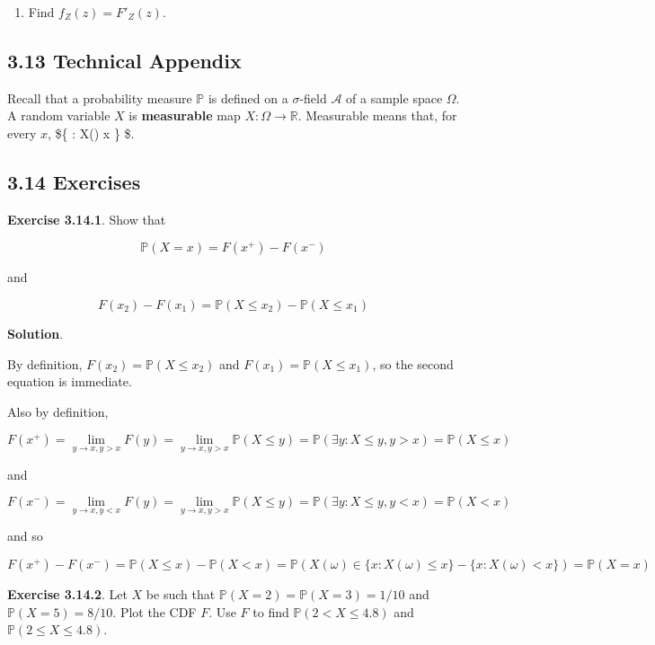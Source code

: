 \begin{enumerate}[tightlist,label={\arabic*.},resume]
\item
  Find \(f_Z(z) = F'_Z(z)\).
\end{enumerate}

\subsection{3.13 Technical Appendix}\label{technical-appendix}

Recall that a probability measure \(\mathbb{P}\) is defined on a
\(\sigma\)-field \(\mathcal{A}\) of a sample space \(\Omega\). A random
variable \(X\) is \textbf{measurable} map
\(X : \Omega \rightarrow \mathbb{R}\). Measurable means that, for every
\(x\), \$\{ \omega : X(\omega) \leq x \} \in {} \$.

\subsection{3.14 Exercises}\label{exercises}

\textbf{Exercise 3.14.1}. Show that

\[ \mathbb{P}(X = x) = F(x^+) - F(x^-) \]

and

\[ F(x_2) - F(x_1) = \mathbb{P}(X \leq x_2) - \mathbb{P}(X \leq x_1) \]

\textbf{Solution}.

By definition, \(F(x_2) = \mathbb{P}(X \leq x_2)\) and
\(F(x_1) = \mathbb{P}(X \leq x_1)\), so the second equation is
immediate.

Also by definition,

\[ F(x^+) = \lim_{y \rightarrow x, y > x} F(y) = \lim_{y \rightarrow x, y > x} \mathbb{P}(X \leq y) 
= \mathbb{P}(\exists y : X \leq y, y > x) 
= \mathbb{P}(X \leq x) \]

and

\[ F(x^-) = \lim_{y \rightarrow x, y < x} F(y) = \lim_{y \rightarrow x, y > x} \mathbb{P}(X \leq y) 
= \mathbb{P}(\exists y : X \leq y, y < x)
= \mathbb{P}(X < x)
\]

and so

\[ F(x^+) - F(x^-) = \mathbb{P}(X \leq x) - \mathbb{P}(X < x) = \mathbb{P}(X(\omega) \in \{x : X(\omega) \leq x \} - \{x: X(\omega) < x \}) = \mathbb{P}(X = x)\]

\textbf{Exercise 3.14.2}. Let \(X\) be such that
\(\mathbb{P}(X = 2) = \mathbb{P}(X = 3) = 1/10\) and
\(\mathbb{P}(X = 5) = 8/10\). Plot the CDF \(F\). Use \(F\) to find
\(\mathbb{P}(2 < X \leq 4.8)\) and \(\mathbb{P}(2 \leq X \leq 4.8)\).


